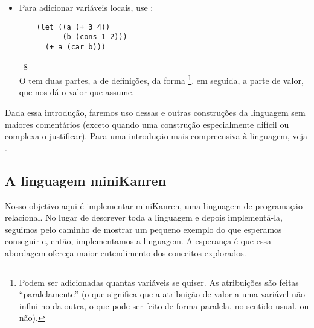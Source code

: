 \documentclass{article}
\begin{document}
\begin{itemize}
  Podem ser adicionadas quantas cláusulas do tipo
   se quiser (vale notar, elas são
  avaliadas sequencialmente), sendo que a última pode
  opcionalmente ser como , ou .

\item Para adicionar variáveis locais, use :
  \begin{lstlisting}
    (let ((a (+ 3 4))
          (b (cons 1 2)))
      (+ a (car b)))
  \end{lstlisting}
  \hspace{1cm} \seta\ 8\\
  O  tem duas partes, a de definições, da forma
  \footnote{Podem ser adicionadas quantas variáveis se
    quiser. As atribuições são feitas ``paralelamente'' (o que
    significa que a atribuição de valor a uma variável não influi no
    da outra, o que pode ser feito de forma paralela, no sentido usual, ou não).}.
  em seguida, a parte de valor, que nos dá o valor que 
  assume.
\end{itemize}


  

  Dada essa introdução, faremos uso dessas e outras construções da
  linguagem sem maiores comentários (exceto quando uma construção
  especialmente difícil ou complexa o justificar). Para uma introdução
  mais compreensiva à linguagem, veja \cite{kent}.

  \subsection{A linguagem miniKanren}

  Nosso objetivo aqui é implementar miniKanren, uma linguagem de
  programação relacional. No lugar de descrever toda a linguagem e
  depois implementá-la, seguimos pelo caminho de mostrar um pequeno
  exemplo do que esperamos conseguir e, então, implementamos a
  linguagem. A esperança é que essa abordagem ofereça maior
  entendimento dos conceitos explorados.
\end{document}
